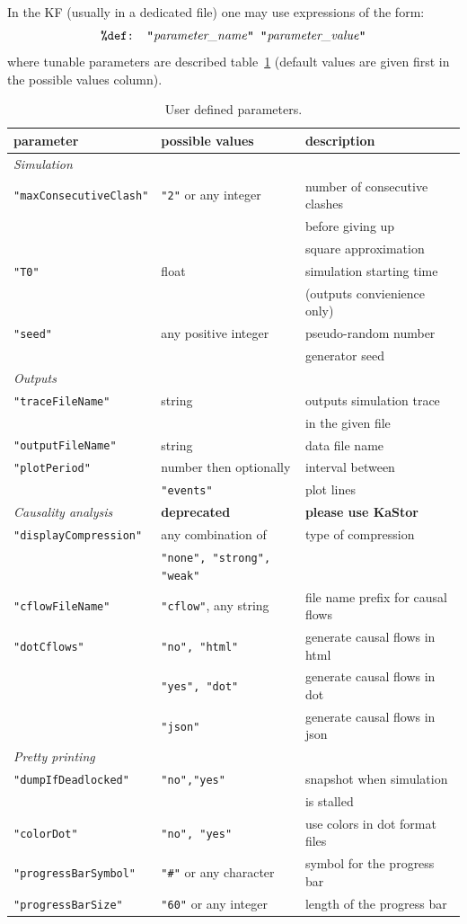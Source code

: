 \documentclass[11pt]{book}
\def\ttt#1{\texttt{#1}}
\begin{document}
In the KF (usually in a dedicated file) one may use expressions of the form:
\[
\hbox{\ttt{\%def: "}\textit{parameter\_name}\ttt{" "}\textit{parameter\_value}\ttt{"}}
\]
where tunable parameters are described table~\ref{tab:parameters} (default values are given first in the possible values column).
\begin{table}[ht]
\caption{User defined parameters.}
\begin{tabular}{l|l|l}
parameter & possible values & description \\
\hline
\textit{Simulation} & &\\
\ttt{"maxConsecutiveClash"} & \ttt{"2"} or any integer & \small number of consecutive clashes \\
&& \small before giving up \\
&& \small square approximation\\
\ttt{"T0"} & float & \small simulation starting time\\
&& \small (outputs convienience only)\\
\ttt{"seed"} & any positive integer & \small pseudo-random number\\
&& \small generator seed\\ \hline
\textit{Outputs}&&\\
\ttt{"traceFileName"} & string & \small outputs simulation trace\\
&&\small in the given file\\
\ttt{"outputFileName"} & string & \small data file name\\
\ttt{"plotPeriod"} & number then optionally& \small interval between\\
& \ttt{"events"} & plot lines\\
\textit{Causality analysis}&\textbf{deprecated}&\textbf{please use KaStor}\\
\ttt{"displayCompression"} & any combination of & \small type of compression \\
&  \ttt{"none", "strong", "weak"} & \\
\ttt{"cflowFileName"} & \ttt{"cflow"}, any string & \small file name prefix for causal flows\\
\ttt{"dotCflows"} & \ttt{"no", "html"} & \small generate causal flows in html \\
& \ttt{"yes", "dot"} & \small generate causal flows in dot \\
& \ttt{"json"} & \small generate causal flows in json\\ \hline
\textit{Pretty printing}& &\\
\ttt{"dumpIfDeadlocked"} & \ttt{"no","yes"} & \small snapshot when simulation \\&&\small is stalled\\
\ttt{"colorDot"} &  \ttt{"no", "yes"} & \small use colors in dot format files\\
\ttt{"progressBarSymbol"} & \ttt{"\#"} or any character & \small symbol for the progress bar\\
\ttt{"progressBarSize"} & \ttt{"60"} or any integer & \small length of the progress bar\\
\end{tabular}
\label{tab:parameters}
\end{table}
\end{document}
